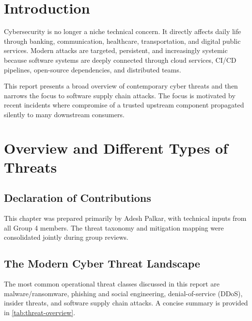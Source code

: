 \clearpage

\hypersetup{linkcolor=black}
\tableofcontents %
\hypersetup{linkcolor=blue}
\renewcommand\arraystretch{1}

\mainmatter %
\pagestyle{thesis} %

\chapter{Introduction}
\label{ch:introduction}

Cybersecurity is no longer a niche technical concern. It directly affects daily life through
banking, communication, healthcare, transportation, and digital public services.
Modern attacks are targeted, persistent, and increasingly systemic because software systems
are deeply connected through cloud services, CI/CD pipelines, open-source dependencies,
and distributed teams.

This report presents a broad overview of contemporary cyber threats and then narrows the focus
to software supply chain attacks. The focus is motivated by recent incidents where compromise
of a trusted upstream component propagated silently to many downstream consumers.

\chapter{Overview and Different Types of Threats}
\label{ch:threat-overview}

\section*{Declaration of Contributions}
This chapter was prepared primarily by Adesh Palkar, with technical inputs from all Group 4 members.
The threat taxonomy and mitigation mapping were consolidated jointly during group reviews.

\section{The Modern Cyber Threat Landscape}

The most common operational threat classes discussed in this report are malware/ransomware,
phishing and social engineering, denial-of-service (DDoS), insider threats, and software supply
chain attacks. A concise summary is provided in \cref{tab:threat-overview}.

